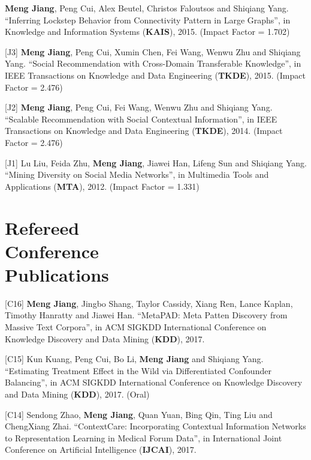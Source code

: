 \documentclass[margin, 9pt]{res}
\begin{document}
\begin{resume}
[J4] \textbf{Meng Jiang}, Peng Cui, Alex Beutel, Christos Faloutsos and Shiqiang Yang. ``Inferring Lockstep Behavior from Connectivity Pattern in Large Graphs'', in Knowledge and Information Systems (\textbf{KAIS}), 2015. (Impact Factor = 1.702)

[J3] \textbf{Meng Jiang}, Peng Cui, Xumin Chen, Fei Wang, Wenwu Zhu and Shiqiang Yang. ``Social Recommendation with Cross-Domain Transferable Knowledge'', in IEEE Transactions on Knowledge and Data Engineering (\textbf{TKDE}), 2015. (Impact Factor = 2.476)

[J2] \textbf{Meng Jiang}, Peng Cui, Fei Wang, Wenwu Zhu and Shiqiang Yang. ``Scalable Recommendation with Social Contextual Information'', in IEEE Transactions on Knowledge and Data Engineering (\textbf{TKDE}), 2014. (Impact Factor = 2.476)

[J1] Lu Liu, Feida Zhu, \textbf{Meng Jiang}, Jiawei Han, Lifeng Sun and Shiqiang Yang. ``Mining Diversity on Social Media Networks'', in Multimedia Tools and Applications (\textbf{MTA}), 2012. (Impact Factor = 1.331)


\section{Refereed \\ Conference \\ Publications}

[C16] \textbf{Meng Jiang}, Jingbo Shang, Taylor Cassidy, Xiang Ren, Lance Kaplan, Timothy Hanratty and Jiawei Han. ``MetaPAD: Meta Patten Discovery from Massive Text Corpora'', in ACM SIGKDD International Conference on Knowledge Discovery and Data Mining (\textbf{KDD}), 2017.

[C15] Kun Kuang, Peng Cui, Bo Li, \textbf{Meng Jiang} and Shiqiang Yang. ``Estimating Treatment Effect in the Wild via Differentiated Confounder Balancing'', in ACM SIGKDD International Conference on Knowledge Discovery and Data Mining (\textbf{KDD}), 2017. (Oral)

[C14] Sendong Zhao, \textbf{Meng Jiang}, Quan Yuan, Bing Qin, Ting Liu and ChengXiang Zhai. ``ContextCare: Incorporating Contextual Information Networks to Representation Learning in Medical Forum Data'', in International Joint Conference on Artificial Intelligence (\textbf{IJCAI}), 2017.


\end{resume}
\end{document}
